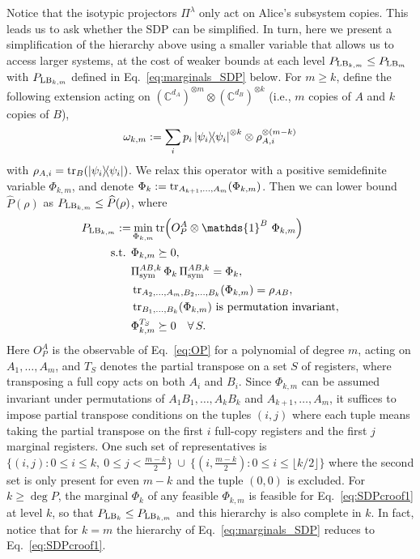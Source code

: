 \documentclass[aps,pra,twocolumn,superscriptaddress]{revtex4-2}
\newcommand{\one}{\mathds{1}}
\newcommand{\I}{\one}
\newcommand{\C}{\mathds{C}}
\begin{document}
Notice that the isotypic projectors $\Pi^\lambda$ only act on Alice's subsystem copies. This leads us to ask whether the SDP can be simplified. In turn, here we present a simplification of the hierarchy above using a smaller variable that allows us to access larger systems, at the cost of weaker bounds at each level $P_{{\rm LB}_{k,m}} \leq P_{{\rm LB}_m}$ with $P_{{\rm LB}_{k,m}}$ defined in Eq.~\eqref{eq:marginals_SDP} below. For $m \geq k$, define the following extension acting on $(\C^{d_A})^{\otimes m}\otimes(\C^{d_B})^{\otimes k}$ (i.e., $m$ copies of $A$ and $k$ copies of $B$),
\begin{equation}\label{eq:omega_km}
    \omega_{k,m} := \sum_i p_i \dyad{\psi_i}^{\otimes k}\otimes \rho_{A,i}^{\otimes (m-k)}
\end{equation}
with $\rho_{A,i} = \tr_B(\dyad{\psi_i})$. We relax this operator with a positive semidefinite variable $\Phi_{k,m}$, and denote $\Phi_{k}:=\tr_{A_{k+1}, \dots, A_m}(\Phi_{k,m})$.
Then we can lower bound $\widehat{P}(\rho)$ as $P_{{\rm LB}_{k,m}}\leq \widehat{P}(\rho)$, where
\begin{align}\label{eq:marginals_SDP}
    P_{{\rm LB}_{k,m}}:=&\min_{\Phi_{k,m}} \tr(O_P^A \otimes \I^B \ \Phi_{k,m})\\
    \text{s.t. } & \Phi_{k,m}\succeq 0, \nonumber\\
    & \Pi_\text{sym}^{AB,k} \, \Phi_{k}\, \Pi_\text{sym}^{AB,k}= \Phi_{k},\nonumber\\
    & \tr_{A_2,\dots,A_m,B_2,\dots,B_k} (\Phi_{k,m}) = \rho_{AB}, \nonumber\\
    & \tr_{B_1,\dots,B_k}(\Phi_{k,m}) \text{ is permutation invariant},\nonumber\\
    & \Phi_{k,m}^{T_S} \succeq 0 \quad  \forall \, S.\nonumber
\end{align}
Here $O_P^A$ is the observable of Eq.~\eqref{eq:OP} for a polynomial of degree $m$, acting on $A_1,\dots,A_m$, and $T_S$ denotes the partial transpose on a set $S$ of registers, where transposing a full copy acts on both $A_i$ and $B_i$. Since $\Phi_{k,m}$ can be assumed invariant under permutations of $A_1B_1, \dots, A_kB_k$ and $A_{k+1}, \dots, A_m$, it suffices to impose partial transpose conditions on the tuples $(i, j)$ where each tuple means taking the partial transpose on the first $i$ full-copy registers and the first $j$ marginal registers. One such set of representatives is $\{(i,j):0\leq i\leq k,\ 0\leq j<\tfrac{m-k}{2}\}\ \cup\ \{(i,\tfrac{m-k}{2}):0\leq i\leq\lfloor k/2\rfloor\}$ where the second set is only present for even $m-k$ and the tuple $(0,0)$ is excluded.
For $k\geq\deg P$, the marginal $\Phi_k$ of any feasible $\Phi_{k,m}$ is feasible for Eq.~\eqref{eq:SDPcroof1} at level $k$, so that $P_{{\rm LB}_k}\leq P_{{\rm LB}_{k,m}}$ and this hierarchy is also complete in $k$. In fact, notice that for $k=m$ the hierarchy of Eq.~\eqref{eq:marginals_SDP} reduces to Eq.~\eqref{eq:SDPcroof1}.
\end{document}
